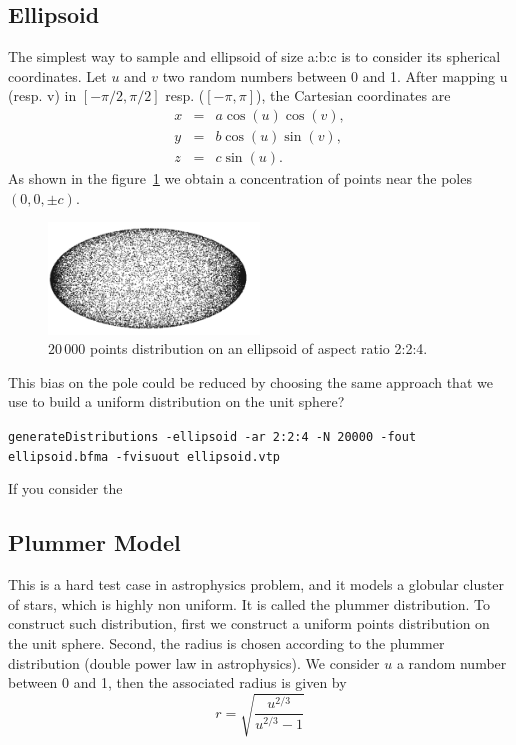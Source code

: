 \documentclass[10pt]{article}
\begin{document}
\subsection{Ellipsoid}
\label{nonuniEllipsoid}
The simplest way to sample and ellipsoid of size a:b:c is to consider its spherical coordinates. Let $u$ and $v$ two random numbers between 0 and 1. After mapping u (resp. v) in $[-\pi/2,\pi/2]$ resp. ($[-\pi,\pi]$), the Cartesian coordinates are    
\begin{eqnarray*}
x	&=&	a\cos(u)\cos(v),\\
y	&=&	b\cos(u)\sin(v), \\
z  &=&	c\sin(u).
\end{eqnarray*}
As shown in the figure~\ref{Fig-nonUnifEllipsoid} we obtain a concentration of points near the poles $(0,0,\pm c)$.
\begin{figure}[hbt]
  \centering
   \includegraphics[width=0.5\textwidth]{ellipsoid}
    \caption{$20\,000$ points distribution on an ellipsoid of aspect ratio 2:2:4.}%
    \label{Fig-nonUnifEllipsoid}
\end{figure}
This bias on the pole could be reduced by choosing the same approach that we use to build a uniform distribution on the unit sphere?


\texttt{generateDistributions -ellipsoid -ar 2:2:4   -N 20000 -fout ellipsoid.bfma  -fvisuout ellipsoid.vtp}

If you consider the 

\subsection{Plummer Model}
This is a hard test case in astrophysics problem, and it models a globular cluster of stars, which is highly non uniform.  It is called   the plummer distribution. To construct such distribution, first we construct a uniform points distribution on the unit sphere. Second, the radius is chosen according to the plummer distribution (double power law in astrophysics). We consider $u$ a random number between 0 and 1, then the associated radius is given by
\begin{equation*}
r = \sqrt{\frac{u^{2/3}}{u^{2/3}-1}}
\end{equation*}
\end{document}
